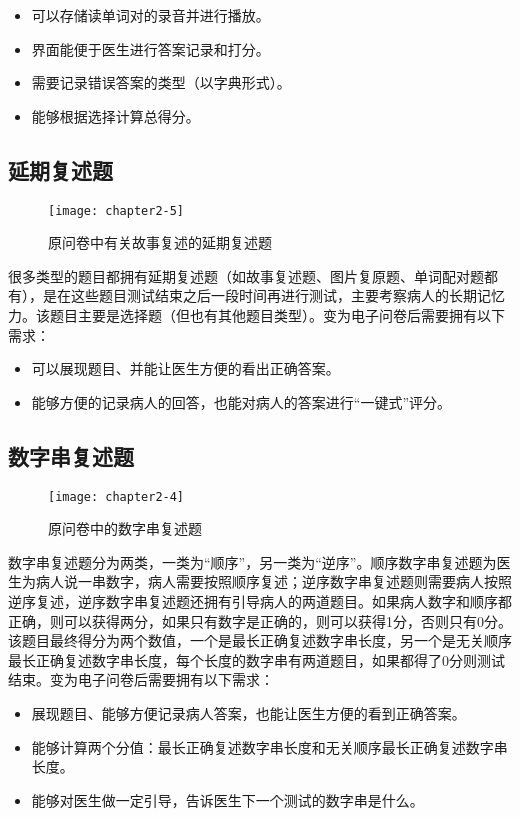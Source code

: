\begin{itemize}
\item 可以存储读单词对的录音并进行播放。
\item	界面能便于医生进行答案记录和打分。
\item	需要记录错误答案的类型（以字典形式）。
\item	能够根据选择计算总得分。
\end{itemize}

\subsection{延期复述题}

\begin{figure}[h]
  \centering
  \texttt{[image: chapter2-5]}
  \caption{原问卷中有关故事复述的延期复述题}
\end{figure}

很多类型的题目都拥有延期复述题（如故事复述题、图片复原题、单词配对题都有），是在这些题目测试结束之后一段时间再进行测试，主要考察病人的长期记忆力。该题目主要是选择题（但也有其他题目类型）。变为电子问卷后需要拥有以下需求：

\begin{itemize}
\item 可以展现题目、并能让医生方便的看出正确答案。
\item	能够方便的记录病人的回答，也能对病人的答案进行“一键式”评分。
\end{itemize}

\subsection{数字串复述题}

\begin{figure}[h]
  \centering
  \texttt{[image: chapter2-4]}
  \caption{原问卷中的数字串复述题}
\end{figure}

数字串复述题分为两类，一类为“顺序”，另一类为“逆序”。顺序数字串复述题为医生为病人说一串数字，病人需要按照顺序复述；逆序数字串复述题则需要病人按照逆序复述，逆序数字串复述题还拥有引导病人的两道题目。如果病人数字和顺序都正确，则可以获得两分，如果只有数字是正确的，则可以获得1分，否则只有0分。该题目最终得分为两个数值，一个是最长正确复述数字串长度，另一个是无关顺序最长正确复述数字串长度，每个长度的数字串有两道题目，如果都得了0分则测试结束。变为电子问卷后需要拥有以下需求：

\begin{itemize}
\item 展现题目、能够方便记录病人答案，也能让医生方便的看到正确答案。
\item	能够计算两个分值：最长正确复述数字串长度和无关顺序最长正确复述数字串长度。
\item 能够对医生做一定引导，告诉医生下一个测试的数字串是什么。
\end{itemize}

